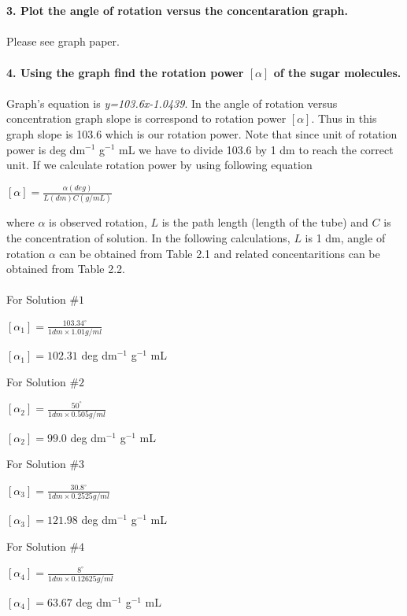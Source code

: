 \documentclass[a4paper,12pt]{report}
\begin{document}
\\\\
\textbf{3. Plot the angle of rotation versus the concentaration graph.}\\\\
Please see graph paper.\\\\
\textbf{4. Using the graph find the rotation power $[\alpha]$ of the sugar molecules.}\\\\
Graph's equation is \textit{y=103.6x-1.0439}. In the angle of rotation versus concentration graph slope is correspond to rotation power $[\alpha]$. Thus in this graph slope is 103.6 which is our rotation power. Note that since unit of rotation power is deg dm$^{-1}$ g$^{-1}$ mL we have to divide 103.6 by 1 dm to reach the correct unit. If we calculate rotation power by using following equation
\begin{center}
{\large 	$[\alpha]=\frac{\alpha (deg)}{L (dm) C (g/mL)}$}
\end{center}
where $\alpha$ is observed rotation, $L$ is the path length (length of the tube) and $C$ is the concentration of solution. In the following calculations, $L$ is 1 dm, angle of rotation $\alpha$ can be obtained from Table 2.1 and related concentaritions can be obtained from Table 2.2.\\\\
For Solution $\#1$
\begin{center}
	$[\alpha_{1}]=\frac{103.34^{\circ}}{1dm\times1.01g/ml}$
\end{center}
\begin{center}
$[\alpha_{1}]=102.31$ deg dm$^{-1}$ g$^{-1}$ mL 
\end{center}
For Solution $\#2$
\begin{center}
	$[\alpha_{2}]=\frac{50^{\circ}}{1dm\times0.505g/ml}$
\end{center}
\begin{center}
	$[\alpha_{2}]=99.0$ deg dm$^{-1}$ g$^{-1}$ mL 
\end{center}
For Solution $\#3$
\begin{center}
	$[\alpha_{3}]=\frac{30.8^{\circ}}{1dm\times0.2525g/ml}$
\end{center}
\begin{center}
	$[\alpha_{3}]=121.98$ deg dm$^{-1}$ g$^{-1}$ mL 
\end{center}
For Solution $\#4$
\begin{center}
	$[\alpha_{4}]=\frac{8^{\circ}}{1dm\times0.12625g/ml}$
\end{center}
\begin{center}
	$[\alpha_{4}]=63.67$ deg dm$^{-1}$ g$^{-1}$ mL 
\end{center}
\end{document}

